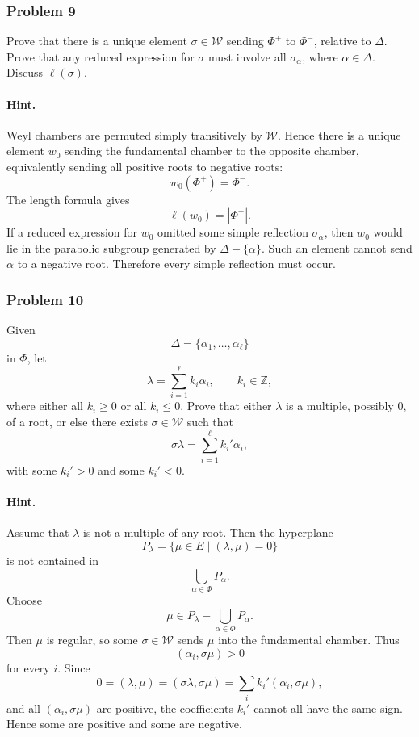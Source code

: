 \documentclass[12pt, a4paper]{article}
\begin{document}
\subsubsection{Problem 9}

Prove that there is a unique element \(\sigma\in\mathcal W\) sending
\(\Phi^+\) to \(\Phi^-\), relative to \(\Delta\). Prove that any reduced
expression for \(\sigma\) must involve all \(\sigma_\alpha\), where
\(\alpha\in\Delta\). Discuss \(\ell(\sigma)\).

\paragraph{Hint.}
Weyl chambers are permuted simply transitively by \(\mathcal W\). Hence there
is a unique element \(w_0\) sending the fundamental chamber to the opposite
chamber, equivalently sending all positive roots to negative roots:
\[
w_0(\Phi^+)=\Phi^-.
\]
The length formula gives
\[
\ell(w_0)=|\Phi^+|.
\]
If a reduced expression for \(w_0\) omitted some simple reflection
\(\sigma_\alpha\), then \(w_0\) would lie in the parabolic subgroup generated
by \(\Delta-\{\alpha\}\). Such an element cannot send \(\alpha\) to a negative
root. Therefore every simple reflection must occur.

\subsubsection{Problem 10}

Given
\[
\Delta=\{\alpha_1,\ldots,\alpha_\ell\}
\]
in \(\Phi\), let
\[
\lambda=\sum_{i=1}^{\ell} k_i\alpha_i,
\qquad
k_i\in\mathbb Z,
\]
where either all \(k_i\geq 0\) or all \(k_i\leq 0\). Prove that either
\(\lambda\) is a multiple, possibly \(0\), of a root, or else there exists
\(\sigma\in\mathcal W\) such that
\[
\sigma\lambda=\sum_{i=1}^{\ell} k_i'\alpha_i,
\]
with some \(k_i'>0\) and some \(k_i'<0\).

\paragraph{Hint.}
Assume that \(\lambda\) is not a multiple of any root. Then the hyperplane
\[
P_\lambda=\{\mu\in E\mid (\lambda,\mu)=0\}
\]
is not contained in
\[
\bigcup_{\alpha\in\Phi}P_\alpha.
\]
Choose
\[
\mu\in P_\lambda-\bigcup_{\alpha\in\Phi}P_\alpha.
\]
Then \(\mu\) is regular, so some \(\sigma\in\mathcal W\) sends \(\mu\) into the
fundamental chamber. Thus
\[
(\alpha_i,\sigma\mu)>0
\]
for every \(i\). Since
\[
0=(\lambda,\mu)=(\sigma\lambda,\sigma\mu)
=
\sum_i k_i'(\alpha_i,\sigma\mu),
\]
and all \((\alpha_i,\sigma\mu)\) are positive, the coefficients \(k_i'\) cannot
all have the same sign. Hence some are positive and some are negative.
\end{document}
